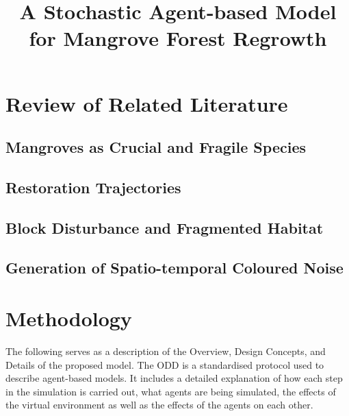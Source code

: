 \documentclass{scl-ug-manuscript}
\begin{document}
\title{A Stochastic Agent-based Model for Mangrove Forest Regrowth}

\twoauthorstrue
{}
{}




\copyrighttrue

\abstractpage{
	
}

\acknowledgmentstrue
{} 

\beforepreface
\listoftables
\listoffigures
\afterpreface


\chapter{Review of Related Literature}\label{rrl}
\section{Mangroves as Crucial and Fragile Species}

\section{Restoration Trajectories}

\section{Block Disturbance and Fragmented Habitat}

\section{Generation of Spatio-temporal Coloured Noise}

\chapter{Methodology}
The following serves as a description of the Overview, Design Concepts, and Details of the proposed model. The ODD is a standardised protocol used to describe agent-based models. It includes a detailed explanation of how each step in the simulation is carried out, what agents are being simulated, the effects of the virtual environment as well as the effects of the agents on each other.

\end{document}

